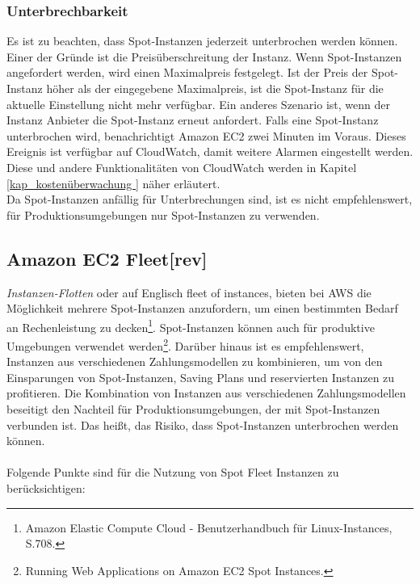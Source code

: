 \subsubsection*{Unterbrechbarkeit}
Es ist zu beachten, dass Spot-Instanzen jederzeit unterbrochen werden können. Einer der Gründe ist die Preisüberschreitung der Instanz. Wenn Spot-Instanzen angefordert werden, wird einen Maximalpreis festgelegt. Ist der Preis der Spot-Instanz höher als der eingegebene Maximalpreis, ist die Spot-Instanz für die aktuelle Einstellung nicht mehr verfügbar. Ein anderes Szenario ist, wenn der Instanz Anbieter die Spot-Instanz erneut anfordert. Falls eine Spot-Instanz unterbrochen wird, benachrichtigt Amazon EC2 zwei Minuten im Voraus. Dieses Ereignis ist verfügbar auf CloudWatch, damit weitere Alarmen eingestellt werden. Diese und andere Funktionalitäten von CloudWatch werden in Kapitel \ref{kap_kostenüberwachung } näher erläutert.
\\
Da Spot-Instanzen anfällig für Unterbrechungen sind, ist es nicht empfehlenswert, für Produktionsumgebungen nur Spot-Instanzen zu verwenden.


\subsection{Amazon EC2 Fleet[rev]} \label{sssec:AWS-EC2-Fleet}
\textit{Instanzen-Flotten} oder auf Englisch fleet of instances, bieten bei AWS die Möglichkeit mehrere Spot-Instanzen anzufordern, um einen bestimmten Bedarf an Rechenleistung zu decken\footnote{Amazon Elastic Compute Cloud - Benutzerhandbuch für Linux-Instances, S.708\cite{AMZ26}.}. Spot-Instanzen können auch für produktive Umgebungen verwendet werden\footnote{ Running Web Applications on Amazon EC2 Spot Instances\cite{AMZ24}.}. Darüber hinaus ist es empfehlenswert, Instanzen aus verschiedenen Zahlungsmodellen zu kombinieren, um von den Einsparungen von Spot-Instanzen, Saving Plans und reservierten Instanzen zu profitieren. Die Kombination von Instanzen aus verschiedenen Zahlungsmodellen beseitigt den Nachteil für Produktionsumgebungen, der mit Spot-Instanzen verbunden ist. Das heißt, das Risiko, dass Spot-Instanzen unterbrochen werden können.
\\\\
Folgende Punkte sind für die Nutzung von Spot Fleet Instanzen zu berücksichtigen:
